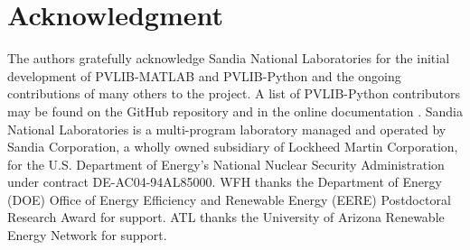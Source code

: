 \documentclass[conference]{IEEEtran}
\begin{document}

\section*{Acknowledgment}
The authors gratefully acknowledge Sandia National Laboratories for the initial development of PVLIB-MATLAB and PVLIB-Python and the ongoing contributions of many others to the project.
A list of PVLIB-Python contributors may be found on the GitHub repository \cite{pvlib-github} and in the online documentation \cite{pvlib-rtd}.
Sandia National Laboratories is a multi-program laboratory managed and operated by Sandia Corporation, a wholly owned subsidiary of Lockheed Martin Corporation, for the U.S. Department of Energy's National Nuclear Security Administration under contract DE-AC04-94AL85000.
WFH thanks the Department of Energy (DOE) Office of Energy Efficiency and Renewable Energy (EERE) Postdoctoral Research Award for support. 
ATL thanks the University of Arizona Renewable Energy Network for support.

\vfil\eject










%
%
%
\end{document}
